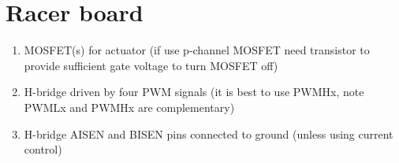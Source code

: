 \documentclass[a4paper, 12pt]{article}
\begin{document}
\section{Racer board}


\begin{enumerate}

\item MOSFET(s) for actuator (if use p-channel MOSFET need transistor
  to provide sufficient gate voltage to turn MOSFET off)

\item H-bridge driven by four PWM signals (it is best to use PWMHx,
  note PWMLx and PWMHx are complementary)

\item H-bridge AISEN and BISEN pins connected to ground (unless using
  current control)

\end{enumerate}
\end{document}
